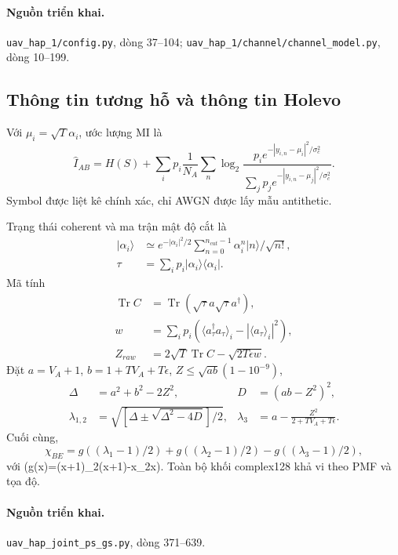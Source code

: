\paragraph{Nguồn triển khai.} \texttt{uav\_hap\_1/config.py}, dòng 37--104; \texttt{uav\_hap\_1/channel/channel\_model.py}, dòng 10--199.

\subsection{Thông tin tương hỗ và thông tin Holevo}

Với \(\mu_i=\sqrt T\alpha_i\), ước lượng MI là
\begin{equation}
\widehat I_{AB}=H(S)+\sum_ip_i\frac1{N_A}\sum_n
\log_2\frac{p_i e^{-|y_{i,n}-\mu_i|^2/\sigma_c^2}}
{\sum_jp_j e^{-|y_{i,n}-\mu_j|^2/\sigma_c^2}}.
\end{equation}
Symbol được liệt kê chính xác, chỉ AWGN được lấy mẫu antithetic.

Trạng thái coherent và ma trận mật độ cắt là
\begin{align}
|\alpha_i\rangle&\simeq e^{-|\alpha_i|^2/2}
\sum_{n=0}^{n_{cut}-1}\alpha_i^n|n\rangle/\sqrt{n!},\\
\tau&=\sum_ip_i|\alpha_i\rangle\langle\alpha_i|.
\end{align}
Mã tính
\begin{align}
\operatorname{Tr}C&=\operatorname{Tr}(\sqrt\tau a\sqrt\tau a^\dagger),\\
w&=\sum_ip_i(\langle a_\tau^\dagger a_\tau\rangle_i-|\langle a_\tau\rangle_i|^2),\\
Z_{raw}&=2\sqrt T\operatorname{Tr}C-\sqrt{2T\epsilon w}.
\end{align}
Đặt \(a=V_A+1\), \(b=1+TV_A+T\epsilon\), \(Z\le\sqrt{ab}(1-10^{-9})\),
\begin{align}
\Delta&=a^2+b^2-2Z^2,&D&=(ab-Z^2)^2,\\
\lambda_{1,2}&=\sqrt{[\Delta\pm\sqrt{\Delta^2-4D}]/2},&
\lambda_3&=a-\frac{Z^2}{2+TV_A+T\epsilon}.
\end{align}
Cuối cùng,
\begin{equation}
\chi_{BE}=g((\lambda_1-1)/2)+g((\lambda_2-1)/2)-g((\lambda_3-1)/2),
\end{equation}
với (g(x)=(x+1)\log_2(x+1)-x\log_2x). Toàn bộ khối complex128 khả vi theo PMF và tọa độ.

\paragraph{Nguồn triển khai.} \texttt{uav\_hap\_joint\_ps\_gs.py}, dòng 371--639.

